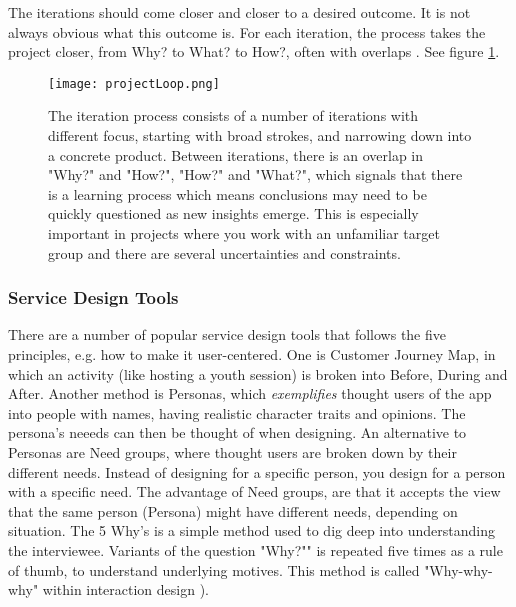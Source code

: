The iterations should come closer and closer to a desired outcome. It is not always obvious what this outcome is. For each iteration, the process takes the project closer, from Why? to What? to How?, often with overlaps \citep{expedition-mondial}. See figure \ref{fig:iterationprocess}.


\begin{figure}[h]
    \centering
    \texttt{[image: projectLoop.png]}
    \caption{The iteration process consists of a number of iterations with different focus, starting with broad strokes, and narrowing down into a concrete product. Between iterations, there is an overlap in "Why?" and "How?", "How?" and "What?", which signals that there is a learning process which means conclusions may need to be quickly questioned as new insights emerge. This is especially important in projects where you work with an unfamiliar target group and there are several uncertainties and constraints.}
    \label{fig:iterationprocess}
\end{figure}

\subsubsection{Service Design Tools}

There are a number of popular service design tools that follows the five principles, e.g. how to make it user-centered. One is Customer Journey Map, in which an activity (like hosting a youth session) is broken into Before, During and After. Another method is Personas, which \textit{exemplifies} thought users of the app into people with names, having realistic character traits and opinions. The persona's neeeds can then be thought of when designing. An alternative to Personas are Need groups, where thought users are broken down by their different needs. Instead of designing for a specific person, you design for a person with a specific need. The advantage of Need groups, are that it accepts the view that the same person (Persona) might have different needs, depending on situation. The 5 Why's is a simple method used to dig deep into understanding the interviewee. Variants of the question "Why?"" is repeated five times as a rule of thumb, to understand underlying motives. This method is called "Why-why-why" within interaction design \citep{lowgren}).

